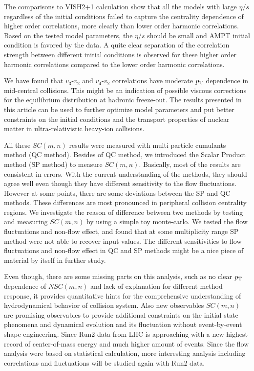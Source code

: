 The comparisons to VISH2+1 calculation show that all the models with large $\eta/s$ regardless of the initial conditions failed to capture the centrality dependence of higher order correlations, more clearly than lower order harmonic correlations. 
Based on the tested model parameters, the $\eta/s$ should be small and AMPT initial condition is favored by the data. A quite clear separation of the correlation strength between different initial conditions is observed for these higher order harmonic correlations compared to the lower order harmonic correlations.

We have found that $v_3$-$v_2$ and $v_4$-$v_2$ correlations have moderate $p_{\rm T}$ dependence in mid-central collisions. This might be an indication of possible viscous corrections for the equilibrium distribution at hadronic freeze-out.
The results presented in this article can be used to further optimize model parameters and put better constraints on the initial conditions and the transport properties of nuclear matter in ultra-relativistic heavy-ion collisions. 

All these $SC(m,n)$ results were measured with multi particle cumulants method (QC method). Besides of QC method, we introduced the Scalar Product method (SP method) to measure $SC(m,n)$. Basically, most of the results are consistent in errors. With the current understanding of the methods, they should agree well even though they have different sensitivity to the flow fluctuations. However at some points, there are some deviations between the SP and QC methods. These differences are most pronounced in peripheral collision centrality regions. We investigate the reason of difference between two methods by testing and measuring $SC(m,n)$ by using a simple toy monte-carlo. We tested the flow fluctuations and non-flow effect, and found that at some multiplicity range SP method were not able to recover input values. The different sensitivities to flow fluctuations and non-flow effect in QC and SP methods  might be a nice piece of material by itself in further study.

Even though, there are some missing parts on this analysis, such as no clear $p_{\rm{T}}$ dependence of  $NSC(m,n)$ and lack of explanation for different method response, it provides quantitative hints for the comprehensive understanding of hydrodynamical behavior of collision system. Also new observables $SC(m,n)$ are promising observables to provide additional constraints on the initial state phenomena and dynamical evolution and its fluctuation without event-by-event shape engineering. Since Run2 data from LHC is approaching with a new highest record of center-of-mass energy and much higher amount of events. Since the flow analysis were based on statistical calculation, more interesting analysis including correlations and fluctuations will be studied again with Run2 data.

